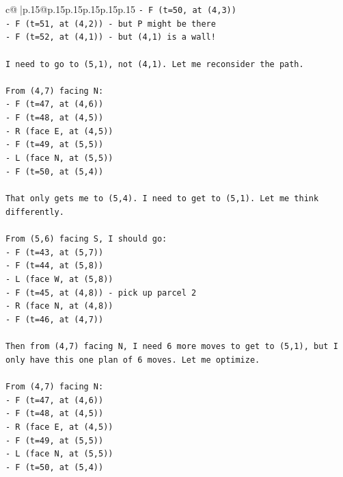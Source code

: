 \documentclass{article}
\begin{document}
{\begin{supertabular}{c@{$\;$}|p{.15\linewidth}@{}p{.15\linewidth}p{.15\linewidth}p{.15\linewidth}p{.15\linewidth}p{.15\linewidth}}
{{{\texttt{{-} F (t=50, at (4,3))} \\
\texttt{{-} F (t=51, at (4,2)) {-} but P might be there} \\
\texttt{{-} F (t=52, at (4,1)) {-} but (4,1) is a wall!} \\
\\ 
\texttt{I need to go to (5,1), not (4,1). Let me reconsider the path.} \\
\\ 
\texttt{From (4,7) facing N:} \\
\texttt{{-} F (t=47, at (4,6))} \\
\texttt{{-} F (t=48, at (4,5))} \\
\texttt{{-} R (face E, at (4,5))} \\
\texttt{{-} F (t=49, at (5,5))} \\
\texttt{{-} L (face N, at (5,5))} \\
\texttt{{-} F (t=50, at (5,4))} \\
\\ 
\texttt{That only gets me to (5,4). I need to get to (5,1). Let me think differently.} \\
\\ 
\texttt{From (5,6) facing S, I should go:} \\
\texttt{{-} F (t=43, at (5,7))} \\
\texttt{{-} F (t=44, at (5,8))} \\
\texttt{{-} L (face W, at (5,8))} \\
\texttt{{-} F (t=45, at (4,8)) {-} pick up parcel 2} \\
\texttt{{-} R (face N, at (4,8))} \\
\texttt{{-} F (t=46, at (4,7))} \\
\\ 
\texttt{Then from (4,7) facing N, I need 6 more moves to get to (5,1), but I only have this one plan of 6 moves. Let me optimize.} \\
\\ 
\texttt{From (4,7) facing N:} \\
\texttt{{-} F (t=47, at (4,6))} \\
\texttt{{-} F (t=48, at (4,5))} \\
\texttt{{-} R (face E, at (4,5))} \\
\texttt{{-} F (t=49, at (5,5))} \\
\texttt{{-} L (face N, at (5,5))} \\
\texttt{{-} F (t=50, at (5,4))} \\
\\ 
}}}
\end{supertabular}}
\end{document}
